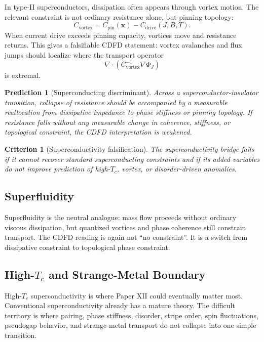 \documentclass[11pt]{article}
\newtheorem{prediction}{Prediction}
\newtheorem{criterion}{Criterion}
\begin{document}
In type-II superconductors, dissipation often appears through vortex motion. The relevant constraint is not ordinary resistance alone, but pinning topology:
\begin{equation}
    C_{\mathrm{vortex}} =
    C_{\mathrm{pin}}(\mathbf{x})
    - C_{\mathrm{drive}}(J,B,T).
\end{equation}
When current drive exceeds pinning capacity, vortices move and resistance returns. This gives a falsifiable CDFD statement: vortex avalanches and flux jumps should localize where the transport operator
\begin{equation}
    \nabla\cdot(C_{\mathrm{vortex}}^{-1}\nabla\Phi_J)
\end{equation}
is extremal.

\begin{prediction}[Superconducting discriminant]
Across a superconductor-insulator transition, collapse of resistance should be accompanied by a measurable reallocation from dissipative impedance to phase stiffness or pinning topology. If resistance falls without any measurable change in coherence, stiffness, or topological constraint, the CDFD interpretation is weakened.
\end{prediction}

\begin{criterion}[Superconductivity falsification]
The superconductivity bridge fails if it cannot recover standard superconducting constraints and if its added variables do not improve prediction of high-$T_c$, vortex, or disorder-driven anomalies.
\end{criterion}

\subsection{Superfluidity}

Superfluidity is the neutral analogue: mass flow proceeds without ordinary viscous dissipation, but quantized vortices and phase coherence still constrain transport. The CDFD reading is again not ``no constraint''. It is a switch from dissipative constraint to topological phase constraint.

\subsection{\texorpdfstring{High-$T_c$ and Strange-Metal Boundary}{High-Tc and Strange-Metal Boundary}}

High-$T_c$ superconductivity is where Paper XII could eventually matter most. Conventional superconductivity already has a mature theory. The difficult territory is where pairing, phase stiffness, disorder, stripe order, spin fluctuations, pseudogap behavior, and strange-metal transport do not collapse into one simple transition.
\end{document}

